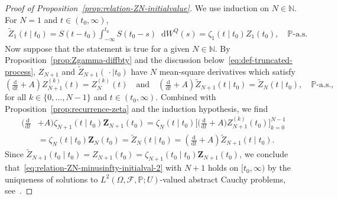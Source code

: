 \documentclass[reqno]{amsart}
\numberwithin{equation}{section}
\newcommand{\bbP}{\mathbb{P}}
\newcommand{\N}{\mathbb{N}}
\newcommand{\cF}{\mathcal{F}}
\newcommand{\rd}{\mathop{}\!\mathrm{d}}
\theoremstyle{remark}
\theoremstyle{definition}
\begin{document}
\begin{proof}[Proof of Proposition~\ref{prop:relation-ZN-initialvalue}]
	We use induction on $N \in \N$.
	For $N=1$ and $t \in (t_0, \infty)$,
	\begin{equation}
		\begin{aligned}
			\widetilde Z_1(t \mid t_0) 
			= 
			S(t-t_0) \int_{-\infty}^{t_0} S(t_0-s)\rd W^Q(s)
			=
			\zeta_1(t \mid t_0) Z_1(t_0), \quad \bbP\text{-a.s.}
		\end{aligned}
	\end{equation}
	Now suppose that the statement is true for a given $N \in \N$.
	By Proposition~\ref{prop:Zgamma-diffbty} and
	the discussion below~\eqref{eq:def-truncated-process}, 
	$Z_{N+1}$ and $\widetilde Z_{N+1}(\,\cdot \mid t_0)$ have $N$ mean-square derivatives
	which satisfy
	\begin{equation}
		\left(\tfrac{\mathrm d}{\mathrm dt} + A \right)Z_{N+1}^{(k)}(t) = Z_{N}^{(k)}(t)
		\quad 
		\text{and}
		\quad
		\left(\tfrac{\mathrm d}{\mathrm dt} + A \right) \widetilde Z_{N+1}(t \mid t_0)
		=
		\widetilde Z_{N}(t \mid t_0), \quad \bbP\text{-a.s.},
	\end{equation}
	for all 
	$k \in \{0, \dots, N-1\}$ and $t \in (t_0, \infty)$.
	Combined with Proposition~\ref{prop:recurrence-zeta}
	and the induction hypothesis, we find
	\begin{align}
		\bigl(\tfrac{\mathrm d}{\mathrm dt} &+ A \bigr) \zeta_{N+1}(t\mid t_0) \mathbf Z_{N+1}(t_0) 
		= 
		\zeta_N(t \mid t_0) \bigl[\bigl(\tfrac{\mathrm d}{\mathrm dt} + A\bigr)Z_{N+1}^{(k)}(t_0)\bigr]_{k=0}^{N-1}
		\\
		&=
		\zeta_N(t \mid t_0)\mathbf Z_{N}(t_0)
		=
		\widetilde Z_N(t \mid t_0)
		=
		\left(\tfrac{\mathrm d}{\mathrm dt} + A \right) \widetilde Z_{N+1}(t \mid t_0).
	\end{align}
	Since $\widetilde Z_{N+1}(t_0 \mid t_0) = Z_{N+1}(t_0) = \zeta_{N+1}(t_0 \mid t_0) \mathbf Z_{N+1}(t_0)$,
	we conclude that~\eqref{eq:relation-ZN-minusinfty-initialval-2}
	with $N+1$ holds on $[t_0, \infty)$ 
	by the uniqueness of solutions to $L^2(\Omega, \cF, \bbP; U)$-valued abstract 
	Cauchy problems, see~\cite[Chapter~4, Theorem~1.3]{Pazy1983}.
\end{proof}
%
\end{document}
